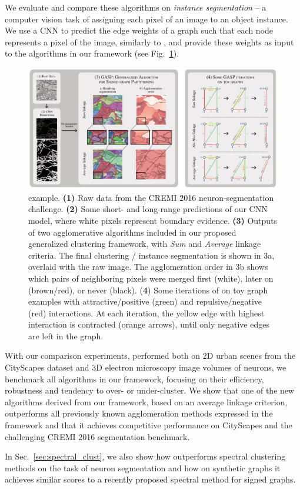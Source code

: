 We evaluate and compare these algorithms on \emph{instance segmentation} -- a computer vision task of assigning each pixel of an image to an object instance. 
We use a CNN to predict the edge weights of a graph such that each node represents a pixel of the image, similarly to \cite{liu2018affinity,lee2017superhuman,wolf2018mutex}, and provide these weights as input to the algorithms in our framework (see Fig.~\ref{fig:intro_figure}). 

\begin{figure}[t]
\centering
\includegraphics[width=\textwidth]{figs/intro_image_v4.pdf} %
\caption{\algname{} example. \textbf{(1)} Raw data from the CREMI 2016 neuron-segmentation challenge. \textbf{(2)} Some short- and long-range predictions of our CNN model, where white pixels represent boundary evidence. \textbf{(3)} Outputs of two agglomerative algorithms included in our proposed generalized clustering framework, with \emph{Sum} and \emph{Average} linkage criteria. The final clustering / instance segmentation is shown in 3a, overlaid with the raw image.  The  agglomeration order in 3b shows which pairs of neighboring pixels were merged first (white), later on (brown/red), or never (black). (\textbf{4}) Some iterations of \algname{} on toy graph examples with attractive/positive (green) and repulsive/negative (red) interactions. At each iteration, the yellow edge with highest interaction is contracted (orange arrows), until only negative edges are left in the graph. 
\label{fig:intro_figure}}
\end{figure}


With our comparison experiments, performed both on 2D urban scenes from the CityScapes dataset and 3D electron microscopy image volumes of neurons, we benchmark all algorithms in our framework, focusing on their efficiency, robustness and tendency to over- or under-cluster.
We show that one of the new algorithms derived from our framework, based on an average linkage criterion, outperforms all previously known agglomeration methods expressed in the framework and that
it achieves competitive performance on CityScapes and the challenging CREMI 2016 segmentation benchmark.

In Sec.~\ref{sec:spectral_clust}, we also show how \algname{} outperforms spectral clustering methods on the task of neuron segmentation and how on synthetic graphs it achieves similar scores to a recently proposed spectral method for signed graphs.



